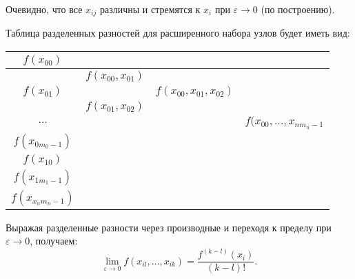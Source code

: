 Очевидно, что все $x_{ij}$ различны и стремятся к $x_i$ при $\varepsilon \to 0$ (по построению).

Таблица разделенных разностей для расширенного набора узлов будет иметь вид:

\begin{center}
  \begin{tabular}{ | c | c | c | c |}
    \hline
    $f(x_{00})$          &                       &              &                \\ \hline
                        & $f(x_{00}, x_{01})   $ &              &                \\ \hline
    $f(x_{01})$          &                       &$f(x_{00}, x_{01}, x_{02})   $ &                  \\ \hline
                        & $f(x_{01}, x_{02} )  $ &              &                \\ \hline
    $\ldots$            &                 &               &  $f(x_{00}, \ldots, x_{n m_n - 1}   $  \\ \hline
    $f(x_{0 m_0-1})$     &       &  &                   \\ \hline
    $f(x_{1 0})$         &  &               & \\ \hline
    $f(x_{1 m_1-1})$     &       &  &                   \\ \hline
    $f(x_{x_n m_n - 1})$ &  &               &                 \\
      \hline
  \end{tabular}
\end{center}

Выражая разделенные разности через производные и переходя к пределу при $\varepsilon \to 0$, получаем:
\begin{equation*}
  \lim\limits_{\varepsilon \to 0} f(x_{il}, \ldots, x_{ik}) = \dfrac{f^{(k-l)} (x_i)}{(k-l)!}.
\end{equation*}
